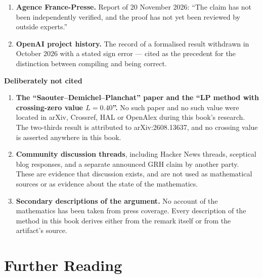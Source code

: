 \begin{enumerate}[leftmargin=1.4em,itemsep=4pt,start=30]
compilations by Andrew Sutherland (MIT) and Simon DeDeo (CMU), and for the
caveat about Lean's being a programming language that ``can also be used to
play sneaky tricks by, for example, redefining symbols used in a proof to
make something trivially true''.
\item \textbf{Agence France-Presse.} Report of 20 November 2026: ``The claim
has not been independently verified, and the proof has not yet been reviewed by
outside experts.''
\item \textbf{OpenAI project history.} The record of a formalised result
withdrawn in October 2026 with a stated sign error --- cited as the precedent
for the distinction between compiling and being correct.
\end{enumerate}

\vspace{8pt}
{\sffamily\bfseries\small Deliberately not cited}

\begin{enumerate}[leftmargin=1.4em,itemsep=4pt,start=36]
\item \textbf{The ``Saouter--Demichel--Planchat'' paper and the ``LP method
with crossing-zero value $L = 0.40$''.} No such paper and no such value were
located in arXiv, Crossref, HAL or OpenAlex during this book's research. The
two-thirds result is attributed to arXiv:2608.13637, and no crossing value is
asserted anywhere in this book.
\item \textbf{Community discussion threads}, including Hacker News threads,
sceptical blog responses, and a separate announced GRH claim by another
party. These are evidence that discussion exists, and are not used as
mathematical sources or as evidence about the state of the mathematics.
\item \textbf{Secondary descriptions of the argument.} No account of the
mathematics has been taken from press coverage. Every description of the
method in this book derives either from the remark itself or from the
artifact's source.
\end{enumerate}

\chapter*{Further Reading}
\thispagestyle{plain}

\noindent\small

